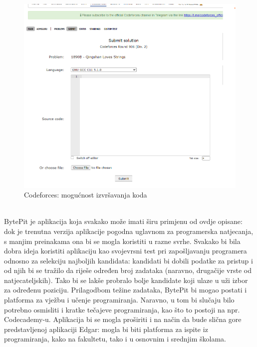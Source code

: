 		\begin{figure}[H]
			\includegraphics[scale=0.4]{slike/cf2}
			\centering
			\caption{Codeforces: mogućnost izvršavanja koda}
			\label{fig:run}
		\end{figure}
		
		\noindent\\
		BytePit je aplikacija koja svakako može imati širu primjenu od ovdje opisane: dok je trenutna verzija aplikacije pogodna uglavnom za programerska natjecanja, s manjim preinakama ona bi se mogla koristiti u razne svrhe. Svakako bi bila dobra ideja koristiti aplikaciju kao svojevrsni test pri zapošljavanju programera odnosno za selekciju najboljih kandidata: kandidati bi dobili podatke za pristup i od njih bi se tražilo da riješe određen broj zadataka (naravno, drugačije vrste od natjecateljskih). Tako bi se lakše probralo bolje kandidate koji ulaze u uži izbor za određenu poziciju. Prilagodbom težine zadataka, BytePit bi mogao postati i platforma za vježbu i učenje programiranja. Naravno, u tom bi slučaju bilo potrebno osmisliti i kratke tečajeve programiranja, kao što to postoji na npr. Codecademy-u.
		Aplikacija bi se mogla proširiti i na način da bude slična gore predstavljenoj aplikaciji Edgar: mogla bi biti platforma za ispite iz programiranja, kako na fakultetu, tako i u osnovnim i srednjim školama.\\
		
		\eject

